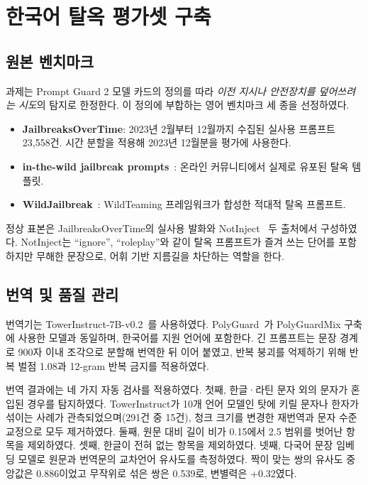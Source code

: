 \documentclass[twocolumn, 10pt]{article}
\begin{document}
\section{한국어 탈옥 평가셋 구축}

\subsection{원본 벤치마크}
과제는 Prompt Guard 2 모델 카드의 정의를 따라 \emph{이전 지시나 안전장치를 덮어쓰려는 시도}의 탐지로 한정한다.
이 정의에 부합하는 영어 벤치마크 세 종을 선정하였다.

\begin{itemize}
\item \textbf{JailbreaksOverTime}: 2023년 2월부터 12월까지 수집된 실사용 프롬프트 23{,}558건. 시간 분할을 적용해 2023년 12월분을 평가에 사용한다.
\item \textbf{in-the-wild jailbreak prompts}~\cite{shen:ccs2024}: 온라인 커뮤니티에서 실제로 유포된 탈옥 템플릿.
\item \textbf{WildJailbreak}~\cite{jiang:neurips2024}: WildTeaming 프레임워크가 합성한 적대적 탈옥 프롬프트.
\end{itemize}

정상 표본은 JailbreaksOverTime의 실사용 발화와 NotInject~\cite{li:acl2025} 두 출처에서 구성하였다.
NotInject는 ``ignore'', ``roleplay''와 같이 탈옥 프롬프트가 즐겨 쓰는 단어를 포함하지만 무해한 문장으로, 어휘 기반 지름길을 차단하는 역할을 한다.

\subsection{번역 및 품질 관리}
번역기는 TowerInstruct-7B-v0.2~\cite{alves:emnlp2024}를 사용하였다.
PolyGuard~\cite{kumar:colm2025}가 PolyGuardMix 구축에 사용한 모델과 동일하며, 한국어를 지원 언어에 포함한다.
긴 프롬프트는 문장 경계로 900자 이내 조각으로 분할해 번역한 뒤 이어 붙였고, 반복 붕괴를 억제하기 위해 반복 벌점 1.08과 12-gram 반복 금지를 적용하였다.

번역 결과에는 네 가지 자동 검사를 적용하였다.
첫째, 한글·라틴 문자 외의 문자가 혼입된 경우를 탐지하였다.
TowerInstruct가 10개 언어 모델인 탓에 키릴 문자나 한자가 섞이는 사례가 관측되었으며(291건 중 15건), 청크 크기를 변경한 재번역과 문자 수준 교정으로 모두 제거하였다.
둘째, 원문 대비 길이 비가 0.15에서 2.5 범위를 벗어난 항목을 제외하였다.
셋째, 한글이 전혀 없는 항목을 제외하였다.
넷째, 다국어 문장 임베딩 모델로 원문과 번역문의 교차언어 유사도를 측정하였다.
짝이 맞는 쌍의 유사도 중앙값은 0.886이었고 무작위로 섞은 쌍은 0.539로, 변별력은 +0.32였다.
\end{document}
